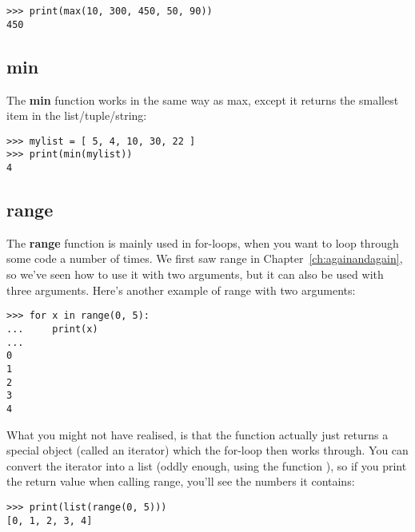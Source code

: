 \begin{Verbatim}[frame=single]
>>> print(max(10, 300, 450, 50, 90))
450
\end{Verbatim}

\subsection*{min}

The \textbf{min} function works in the same way as max, except it returns the smallest item in the list/tuple/string:

\begin{Verbatim}[frame=single]
>>> mylist = [ 5, 4, 10, 30, 22 ]
>>> print(min(mylist))
4
\end{Verbatim}

\subsection*{range}

The \textbf{range} function is mainly used in for-loops, when you want to loop through some code a number of times. We first saw range in Chapter~\ref{ch:againandagain}, so we've seen how to use it with two arguments, but it can also be used with three arguments. Here's another example of range with two arguments:

\begin{Verbatim}[frame=single]
>>> for x in range(0, 5):
...     print(x)
...
0
1
2
3
4
\end{Verbatim}

\noindent
What you might not have realised, is that the  function actually just returns a special object (called an iterator) which the for-loop then works through. You can convert the iterator into a list (oddly enough, using the function ), so if you print the return value when calling range, you'll see the numbers it contains:

\begin{Verbatim}[frame=single]
>>> print(list(range(0, 5)))
[0, 1, 2, 3, 4]
\end{Verbatim}

